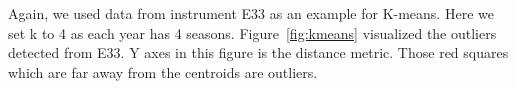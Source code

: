 Again, we used data from instrument E33 as an example for K-means. Here
we set k to 4 as each year has 4 seasons.  Figure~\ref{fig:kmeans}
visualized the outliers detected from E33. Y axes in this figure is the
distance metric. Those red squares which are far away from the centroids
are outliers.


